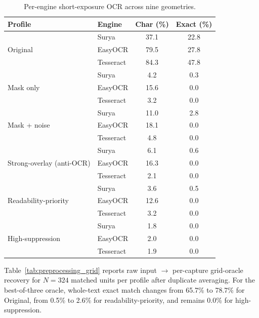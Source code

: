\documentclass{ieeeaccess}
\begin{document}
\begin{table}[!t]
\caption{Per-engine short-exposure OCR across nine geometries.}
\label{tab:real_ocr_engine}
\centering
\footnotesize
\setlength{\tabcolsep}{5.0pt}
\begin{tabular}{llcc}
\toprule
Profile & Engine & Char (\%) & Exact (\%) \\
\midrule
\multirow{3}{*}{Original}
 & Surya & 37.1 & 22.8 \\
 & EasyOCR & 79.5 & 27.8 \\
 & Tesseract & 84.3 & 47.8 \\
\midrule
\multirow{3}{*}{Mask only}
 & Surya & 4.2 & 0.3 \\
 & EasyOCR & 15.6 & 0.0 \\
 & Tesseract & 3.2 & 0.0 \\
\midrule
\multirow{3}{*}{Mask + noise}
 & Surya & 11.0 & 2.8 \\
 & EasyOCR & 18.1 & 0.0 \\
 & Tesseract & 4.8 & 0.0 \\
\midrule
\multirow{3}{*}{Strong-overlay (anti-OCR)}
 & Surya & 6.1 & 0.6 \\
 & EasyOCR & 16.3 & 0.0 \\
 & Tesseract & 2.1 & 0.0 \\
\midrule
\multirow{3}{*}{Readability-priority}
 & Surya & 3.6 & 0.5 \\
 & EasyOCR & 12.6 & 0.0 \\
 & Tesseract & 3.2 & 0.0 \\
\midrule
\multirow{3}{*}{High-suppression}
 & Surya & 1.8 & 0.0 \\
 & EasyOCR & 2.0 & 0.0 \\
 & Tesseract & 1.9 & 0.0 \\
\bottomrule
\end{tabular}
\end{table}

Table~\ref{tab:preprocessing_grid} reports raw input $\rightarrow$ per-capture grid-oracle recovery for $N=324$ matched units per profile after duplicate averaging. For the best-of-three oracle, whole-text exact match changes from 65.7\% to 78.7\% for Original, from 0.5\% to 2.6\% for readability-priority, and remains 0.0\% for high-suppression.
\end{document}
